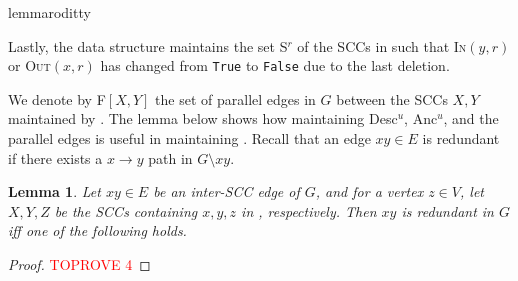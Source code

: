 \documentclass[11pt]{article}
\newtheorem{lemma}[theorem]{Lemma}
\newcommand{\graph}[1]{\text{\( G^{#1} \)\xspace}}
\newcommand{\TR}[0]{\text{\( G^{t} \)}\xspace}
\renewcommand{\textsc}[1]{\textnormal{\scshape #1}}
\newcommand{\desc}[1]{\textrm{{\normalfont Desc}\( ^{ #1 }\)}\xspace}
\newcommand{\anc}[1]{\textrm{{\normalfont Anc}\( ^{ #1 }\)}\xspace}
\newcommand{\s}[1]{\textrm{{\normalfont S}\( ^{ #1 } \)}\xspace}
\newcommand{\E}[1]{\text{\( E^{#1} \)}\xspace}
\newcommand{\F}[2]{\textrm{F\( [ #1, #2 ]  \)}\xspace}
\newcommand{\edge}[2]{\ensuremath{ #1 #2 }\xspace}
\begin{document}
{\begin{restatable}{lemma}{roditty}


Lastly, the data structure maintains the set \s{r} of the SCCs in \graph{r} such that \textsc{In\( (y, r) \)} or \textsc{Out\( (x, r) \)} has changed from \texttt{True} to \texttt{False} due to the last deletion.
 
\end{restatable}


We denote by \F{X}{Y} the set of parallel edges in \( G \) between the SCCs \( X, Y \) maintained by .
The lemma below shows how maintaining \desc{u}, \anc{u}, and the parallel edges is useful in maintaining \TR.
Recall that an edge \( \edge{x}{y} \in E \) is redundant if there exists a \( x \to y \) path in \( G \setminus xy \).




\begin{lemma}\label{lem:redundant_general}
Let \( \edge{x}{y} \in E \) be an 
 inter-SCC edge of \( G \), and for a vertex \( z \in V \), let \( X, Y, Z \) be the SCCs containing \( x, y, z \) in \graph{z}, respectively.
Then \edge{x}{y} is redundant in \( G \) iff one of the following holds.
\end{lemma}
\begin{proof}\textcolor{red}{TOPROVE 4}\end{proof}

}
\end{document}

